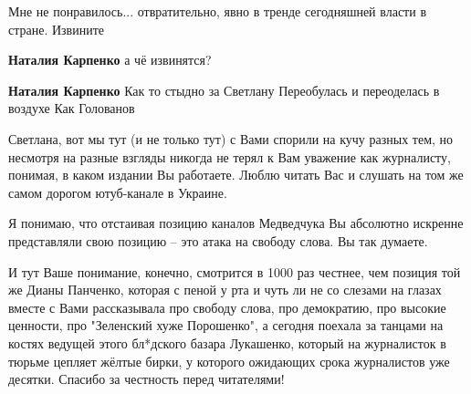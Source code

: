 \begin{itemize}
Мне не понравилось... отвратительно, явно в тренде сегодняшней власти в стране.
Извините

\begin{itemize}
 
\textbf{Наталия Карпенко} а чё извинятся?

 
\textbf{Наталия Карпенко}
\obeycr
	Как то стыдно за Светлану
	Переобулась и переоделась в воздухе
	Как Голованов
\restorecr
\end{itemize}

 

Светлана, вот мы тут (и не только тут) с Вами спорили на кучу разных тем, но
несмотря на разные взгляды никогда не терял к Вам уважение как журналисту,
понимая, в каком издании Вы работаете. Люблю читать Вас и слушать на том же
самом дорогом ютуб-канале в Украине. 

Я понимаю, что отстаивая позицию каналов Медведчука Вы абсолютно искренне
представляли свою позицию – это атака на свободу слова. Вы так думаете. 

И тут Ваше понимание, конечно, смотрится в 1000 раз честнее, чем позиция той же
Дианы Панченко, которая с пеной у рта и чуть ли не со слезами на глазах вместе
с Вами рассказывала про свободу слова, про демократию, про высокие ценности,
про "Зеленский хуже Порошенко", а сегодня поехала за танцами на костях ведущей
этого бл*дского базара Лукашенко, который на журналисток в тюрьме цепляет
жёлтые бирки, у которого ожидающих срока журналистов уже десятки. Спасибо за
честность перед читателями!

\begin{itemize}
 

\end{itemize}
\end{itemize}
